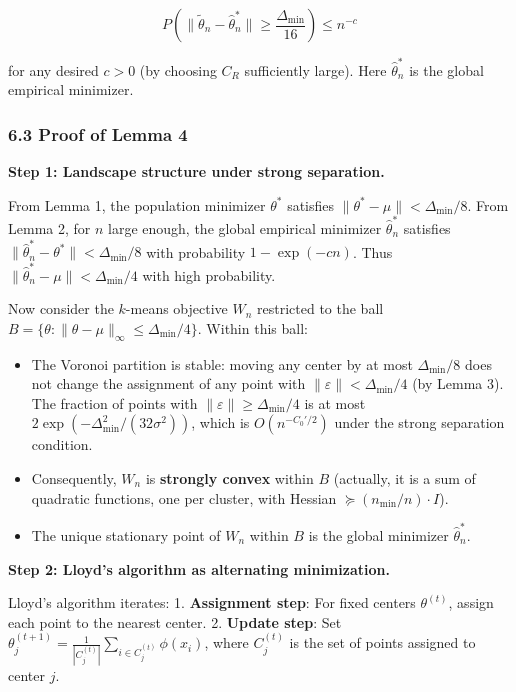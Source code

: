 \documentclass[
  12pt,
]{article}
\providecommand{\tightlist}{%
  \setlength{\itemsep}{0pt}\setlength{\parskip}{0pt}}
\begin{document}
\[P\left(\|\tilde{\theta}_n - \hat{\theta}_n^*\| \geq \frac{\Delta_{\min}}{16}\right) \leq n^{-c}\]

for any desired \(c > 0\) (by choosing \(C_R\) sufficiently large). Here
\(\hat{\theta}_n^*\) is the global empirical minimizer.

\subsubsection{6.3 Proof of Lemma 4}\label{proof-of-lemma-4}

\textbf{Step 1: Landscape structure under strong separation.}

From Lemma 1, the population minimizer \(\theta^*\) satisfies
\(\|\theta^* - \mu\| < \Delta_{\min}/8\). From Lemma 2, for \(n\) large
enough, the global empirical minimizer \(\hat{\theta}_n^*\) satisfies
\(\|\hat{\theta}_n^* - \theta^*\| < \Delta_{\min}/8\) with probability
\(1 - \exp(-c n)\). Thus
\(\|\hat{\theta}_n^* - \mu\| < \Delta_{\min}/4\) with high probability.

Now consider the \(k\)-means objective \(W_n\) restricted to the ball
\(B = \{\theta : \|\theta - \mu\|_\infty \leq \Delta_{\min}/4\}\).
Within this ball:

\begin{itemize}
\tightlist
\item
  The Voronoi partition is stable: moving any center by at most
  \(\Delta_{\min}/8\) does not change the assignment of any point with
  \(\|\varepsilon\| < \Delta_{\min}/4\) (by Lemma 3). The fraction of
  points with \(\|\varepsilon\| \geq \Delta_{\min}/4\) is at most
  \(2\exp(-\Delta_{\min}^2/(32\sigma^2))\), which is \(O(n^{-C_0'/2})\)
  under the strong separation condition.
\item
  Consequently, \(W_n\) is \textbf{strongly convex} within \(B\)
  (actually, it is a sum of quadratic functions, one per cluster, with
  Hessian \(\succeq (n_{\min}/n) \cdot I\)).
\item
  The unique stationary point of \(W_n\) within \(B\) is the global
  minimizer \(\hat{\theta}_n^*\).
\end{itemize}

\textbf{Step 2: Lloyd's algorithm as alternating minimization.}

Lloyd's algorithm iterates: 1. \textbf{Assignment step}: For fixed
centers \(\theta^{(t)}\), assign each point to the nearest center. 2.
\textbf{Update step}: Set
\(\theta_j^{(t+1)} = \frac{1}{|C_j^{(t)}|} \sum_{i \in C_j^{(t)}} \phi(x_i)\),
where \(C_j^{(t)}\) is the set of points assigned to center \(j\).
\end{document}
